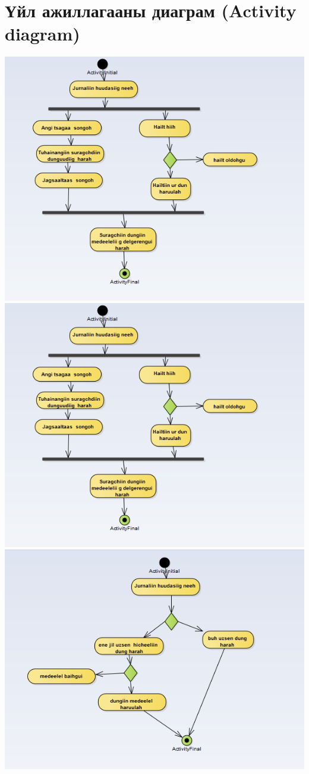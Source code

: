 \documentclass[12pd]{article}
\begin{document}
	\section{Үйл ажиллагааны диаграм (Activity diagram)}
	\includegraphics[width=\textwidth]{ac1}
	\includegraphics[width=\textwidth]{ac2}
	\includegraphics[width=\textwidth]{ac3}
\end{document}
